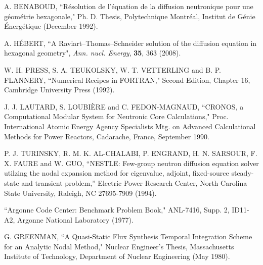 \begin{thebibliography}{99}
A. BENABOUD, ``R\'esolution de l'\'equation de la diffusion neutronique pour une g\'eom\'etrie hexagonale," Ph. D. Thesis, Polytechnique Montr\'eal, Institut de G\'enie \'Energ\'etique (December 1992).

A. H\'EBERT, ``A Raviart--Thomas--Schneider solution of the diffusion equation in hexagonal geometry", {\sl Ann. nucl. Energy},
{\bf 35}, 363 (2008).

W. H. PRESS, S. A. TEUKOLSKY, W. T. VETTERLING and B. P. FLANNERY, ``Numerical Recipes in FORTRAN," Second Edition, Chapter 16, Cambridge University Press (1992).

J. J. LAUTARD, S. LOUBI\`ERE and C. FEDON-MAGNAUD, ``CRONOS, a Computational Modular System for Neutronic Core Calculations," Proc. International Atomic Energy Agency Specialists Mtg. on Advanced Calculational Methods for Power Reactors, Cadarache, France, September 1990.

P. J. TURINSKY, R. M. K. AL-CHALABI, P. ENGRAND, H. N. SARSOUR, F. X. FAURE and  W. GUO, ``NESTLE: Few-group neutron diffusion equation solver utilzing the nodal expansion
method for eigenvalue, adjoint, fixed-source steady-state and transient problem,'' Electric Power Research Center, North Carolina State University, Raleigh, NC 27695-7909 (1994).

``Argonne Code Center: Benchmark Problem Book," ANL-7416, Supp. 2, ID11-A2, Argonne National Laboratory (1977).

G. GREENMAN, ``A Quasi-Static Flux Synthesis Temporal Integration Scheme for an Analytic Nodal Method," Nuclear Engineer's Thesis, Massachusetts Institute of Technology, Department of Nuclear Engineering (May 1980).

\end{thebibliography}

